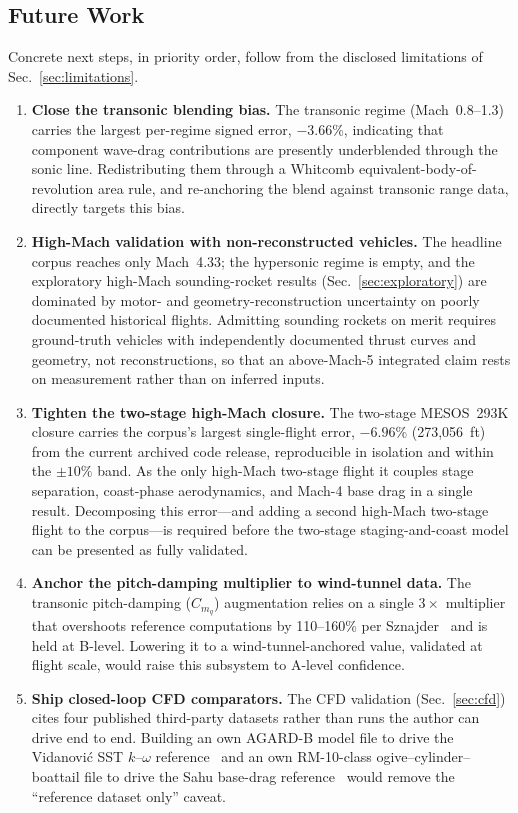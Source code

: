 \subsection{Future Work}

Concrete next steps, in priority order, follow from the disclosed limitations of
Sec.~\ref{sec:limitations}.

\begin{enumerate}
  \item \textbf{Close the transonic blending bias.} The transonic regime
    (Mach~0.8--1.3) carries the largest per-regime signed error, $-3.66\%$,
    indicating that component wave-drag contributions are presently underblended
    through the sonic line. Redistributing them through a Whitcomb
    equivalent-body-of-revolution area rule, and re-anchoring the blend against
    transonic range data, directly targets this bias.
  \item \textbf{High-Mach validation with non-reconstructed vehicles.} The
    headline corpus reaches only Mach~4.33; the hypersonic regime is empty, and
    the exploratory high-Mach sounding-rocket results
    (Sec.~\ref{sec:exploratory}) are dominated by motor- and
    geometry-reconstruction uncertainty on poorly documented historical flights.
    Admitting sounding rockets on merit requires ground-truth vehicles with
    independently documented thrust curves and geometry, not reconstructions, so
    that an above-Mach-5 integrated claim rests on measurement rather than on
    inferred inputs.
  \item \textbf{Tighten the two-stage high-Mach closure.} The two-stage
    MESOS~293K closure carries the corpus's largest single-flight error, $-6.96\%$
    (273{,}056~ft) from the current archived code release, reproducible in
    isolation and within the $\pm10\%$ band. As the only high-Mach two-stage flight
    it couples stage separation, coast-phase aerodynamics, and Mach-4 base drag in
    a single result. Decomposing this error---and adding a second high-Mach
    two-stage flight to the corpus---is required before the two-stage
    staging-and-coast model can be presented as fully validated.
  \item \textbf{Anchor the pitch-damping multiplier to wind-tunnel data.} The
    transonic pitch-damping ($C_{m_q}$) augmentation relies on a single $3\times$
    multiplier that overshoots reference computations by 110--160\% per
    Sznajder~\cite{sznajder2025} and is held at B-level. Lowering it to a
    wind-tunnel-anchored value, validated at flight scale, would raise this
    subsystem to A-level confidence.
  \item \textbf{Ship closed-loop CFD comparators.} The CFD validation
    (Sec.~\ref{sec:cfd}) cites four published third-party datasets rather than
    runs the author can drive end to end. Building an own AGARD-B model file to
    drive the Vidanovi\'c SST $k$--$\omega$ reference~\cite{vidanovic2014} and an
    own RM-10-class ogive--cylinder--boattail file to drive the Sahu base-drag
    reference~\cite{sahu1983} would remove the ``reference dataset only'' caveat.
\end{enumerate}

